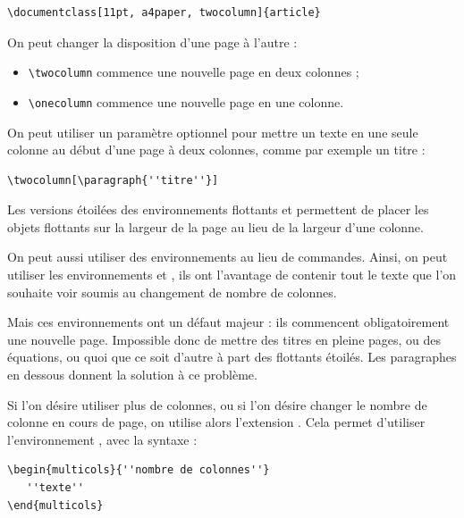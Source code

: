 \documentclass[a4paper,twoside]{article}
\begin{document}
\begin{verbatim}
\documentclass[11pt, a4paper, twocolumn]{article}
\end{verbatim}

\bigskip

On peut changer la disposition d'une page à l'autre :
\begin{itemize}
\item \verb|\twocolumn| commence une nouvelle page en deux colonnes ;
\item \verb|\onecolumn| commence une nouvelle page en une colonne.
\end{itemize}

On peut utiliser un paramètre optionnel pour mettre un texte en une seule colonne au début d'une page à deux colonnes, comme par exemple un titre :

\begin{verbatim}
\twocolumn[\paragraph{''titre''}]
\end{verbatim}

Les versions étoilées des environnements flottants  et  permettent de placer les objets flottants sur la largeur de la page au lieu de la largeur d'une colonne.

\begin{remarque}
On peut aussi utiliser des environnements au lieu de commandes. Ainsi, on peut utiliser les environnements  et , ils ont l'avantage de contenir tout le texte que l'on souhaite voir soumis au changement de nombre de colonnes.

Mais ces environnements ont un défaut majeur : ils commencent obligatoirement une nouvelle page. Impossible donc de mettre des titres en pleine pages, ou des équations, ou quoi que ce soit d'autre à part des flottants étoilés. Les paragraphes en dessous donnent la solution à ce problème.
\end{remarque}


Si l'on désire utiliser plus de colonnes, ou si l'on désire changer le nombre de colonne en cours de page, on utilise alors l'extension . Cela permet d'utiliser l'environnement , avec la syntaxe :

\begin{verbatim}
\begin{multicols}{''nombre de colonnes''}
   ''texte''
\end{multicols}
\end{verbatim}
\end{document}
